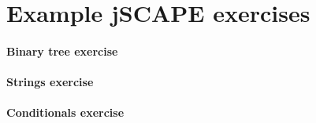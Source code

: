 \appendix
\chapter{Example jSCAPE exercises}
\label{chap:example-jscape-exercises}

\subsubsection{Binary tree exercise}


\subsubsection{Strings exercise}


\subsubsection{Conditionals exercise}


